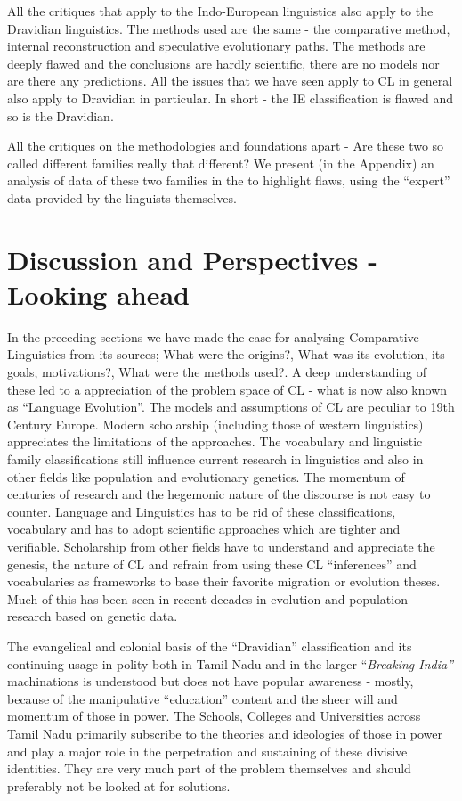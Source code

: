All the critiques that apply to the Indo-European linguistics also apply to the Dravidian linguistics. The methods used are the same - the comparative method, internal reconstruction and speculative evolutionary paths. The methods are deeply flawed and the conclusions are hardly scientific, there are no models nor are there any predictions. All the issues that we have seen apply to CL in general also apply to Dravidian in particular. In short - the IE classification is flawed and so is the Dravidian.

All the critiques on the methodologies and foundations apart - Are these two so called different families really that different? We present (in the Appendix) an analysis of data of these two families in the to highlight flaws, using the “expert” data provided by the linguists themselves.


\section*{Discussion and Perspectives - Looking ahead}

In the preceding sections we have made the case for analysing Comparative Linguistics from its sources; What were the origins?, What was its evolution, its goals, motivations?, What were the methods used?. A deep understanding of these led to a appreciation of the problem space of CL - what is now also known as “Language Evolution”. The models and assumptions of CL are peculiar to 19th Century Europe. Modern scholarship (including those of western linguistics) appreciates the limitations of the approaches. The vocabulary and linguistic family classifications still influence current research in linguistics and also in other fields like population and evolutionary genetics. The momentum of centuries of research and the hegemonic nature of the discourse is not easy to counter. Language and Linguistics has to be rid of these classifications, vocabulary and has to adopt scientific approaches which are tighter and verifiable. Scholarship from other fields have to understand and appreciate the genesis, the nature of CL and refrain from using these CL “inferences” and vocabularies as frameworks to base their favorite migration or evolution theses. Much of this has been seen in recent decades in evolution and population research based on genetic data.

The evangelical and colonial basis of the “Dravidian” classification and its continuing usage in polity both in Tamil Nadu and in the larger “\textit{Breaking India”} machinations is understood but does not have popular awareness - mostly, because of the manipulative “education” content and the sheer will and momentum of those in power. The Schools, Colleges and Universities across Tamil Nadu primarily subscribe to the theories and ideologies of those in power and play a major role in the perpetration and sustaining of these divisive identities. They are very much part of the problem themselves and should preferably not be looked at for solutions.

